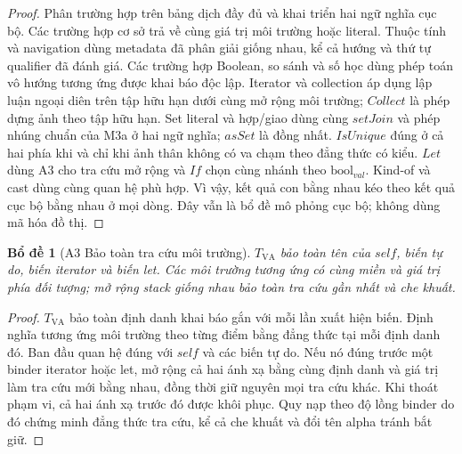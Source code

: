 \documentclass[11pt,a4paper]{article}
\newtheorem{lemma}{Bổ đề}
\theoremstyle{definition}
\newcommand{\boolval}{\mathrm{bool}_{val}}
\begin{document}
\begin{proof}
Phân trường hợp trên bảng dịch đầy đủ và khai triển hai ngữ nghĩa cục bộ. Các
trường hợp cơ sở trả về cùng giá trị môi trường hoặc literal. Thuộc tính và
navigation dùng metadata đã phân giải giống nhau, kể cả hướng và thứ tự
qualifier đã đánh giá. Các trường hợp Boolean, so sánh và số học dùng phép toán
vô hướng tương ứng được khai báo độc lập. Iterator và collection áp dụng lập
luận ngoại diên trên tập hữu hạn dưới cùng mở rộng môi trường; $Collect$ là
phép dựng ảnh theo tập hữu hạn. Set literal và hợp/giao dùng cùng
$setJoin$ và phép nhúng chuẩn của M3a ở hai ngữ nghĩa; $asSet$ là đồng nhất.
$IsUnique$ đúng ở cả hai phía khi và chỉ khi ảnh thân không có va chạm theo
đẳng thức có kiểu. $Let$ dùng A3 cho tra cứu mở rộng và $If$ chọn
cùng nhánh theo $\boolval$. Kind-of và cast dùng cùng quan hệ phù hợp. Vì vậy,
kết quả con bằng nhau kéo theo kết quả cục bộ bằng nhau ở mọi dòng. Đây vẫn là
bổ đề mô phỏng cục bộ; không dùng mã hóa đồ thị.
\end{proof}

\begin{lemma}[A3 Bảo toàn tra cứu môi trường]
$T_{\mathrm{VA}}$ bảo toàn tên của $self$, biến tự do, biến iterator và biến
let. Các môi trường tương ứng có cùng miền và giá trị phía đối tượng; mở rộng
stack giống nhau bảo toàn tra cứu gần nhất và che khuất.
\end{lemma}
\begin{proof}
$T_{\mathrm{VA}}$ bảo toàn định danh khai báo gắn với mỗi lần xuất hiện biến.
Định nghĩa tương ứng môi trường theo từng điểm bằng đẳng thức tại mỗi định danh
đó. Ban đầu quan hệ đúng với $self$ và các biến tự do. Nếu nó đúng trước một
binder iterator hoặc let, mở rộng cả hai ánh xạ bằng cùng định danh và giá trị
làm tra cứu mới bằng nhau, đồng thời giữ nguyên mọi tra cứu khác. Khi thoát
phạm vi, cả hai ánh xạ trước đó được khôi phục. Quy nạp theo độ lồng binder do
đó chứng minh đẳng thức tra cứu, kể cả che khuất và đổi tên alpha tránh bắt giữ.
\end{proof}
\end{document}
